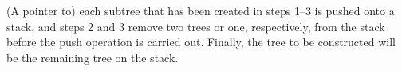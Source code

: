 (A pointer to) each subtree that has been                                       
created in steps 1--3 is pushed onto a stack, and                               
steps 2 and 3 remove two trees or one, respectively,                            
from the stack before the push                                                  
operation is carried out. Finally, the tree to be constructed will              
be the remaining tree on the 
stack.                                             
                                                                                
